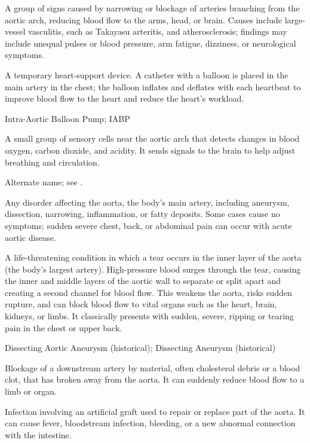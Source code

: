  A group of signs caused by narrowing or blockage of arteries branching from the aortic arch, reducing blood flow to the arms, head, or brain. Causes include large-vessel vasculitis, such as Takayasu arteritis, and atherosclerosis; findings may include unequal pulses or blood pressure, arm fatigue, dizziness, or neurological symptoms.

 A temporary heart-support device. A catheter with a balloon is placed in the main artery in the chest; the balloon inflates and deflates with each heartbeat to improve blood flow to the heart and reduce the heart's workload.

\synonyms
Intra-Aortic Balloon Pump; IABP

 A small group of sensory cells near the aortic arch that detects changes in blood oxygen, carbon dioxide, and acidity. It sends signals to the brain to help adjust breathing and circulation.

 Alternate name; see .

 Any disorder affecting the aorta, the body’s main artery, including aneurysm, dissection, narrowing, inflammation, or fatty deposits. Some cases cause no symptoms; sudden severe chest, back, or abdominal pain can occur with acute aortic disease.

 A life-threatening condition in which a tear occurs in the inner layer of the aorta (the body's largest artery). High-pressure blood surges through the tear, causing the inner and middle layers of the aortic wall to separate or split apart and creating a second channel for blood flow. This weakens the aorta, risks sudden rupture, and can block blood flow to vital organs such as the heart, brain, kidneys, or limbs. It classically presents with sudden, severe, ripping or tearing pain in the chest or upper back.

\synonyms
Dissecting Aortic Aneurysm (historical); Dissecting Aneurysm (historical)

 Blockage of a downstream artery by material, often cholesterol debris or a blood clot, that has broken away from the aorta. It can suddenly reduce blood flow to a limb or organ.

 Infection involving an artificial graft used to repair or replace part of the aorta. It can cause fever, bloodstream infection, bleeding, or a new abnormal connection with the intestine.

